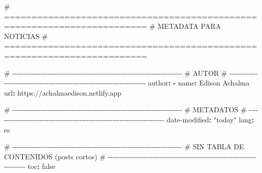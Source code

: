 \documentclass[
  doc,
  floatsintext,
  longtable,
  a4paper,
  nolmodern,
  notxfonts,
  notimes,
  12pt,
  colorlinks=true,linkcolor=blue,citecolor=blue,urlcolor=blue]{apa7}
\newenvironment{Shaded}{\begin{snugshade}}{\end{snugshade}}
\newcommand{\AttributeTok}[1]{\textcolor[rgb]{0.40,0.45,0.13}{#1}}
\newcommand{\CharTok}[1]{\textcolor[rgb]{0.13,0.47,0.30}{#1}}
\newcommand{\CommentTok}[1]{\textcolor[rgb]{0.37,0.37,0.37}{#1}}
\newcommand{\FunctionTok}[1]{\textcolor[rgb]{0.28,0.35,0.67}{#1}}
\newcommand{\KeywordTok}[1]{\textcolor[rgb]{0.00,0.23,0.31}{\textbf{#1}}}
\newcommand{\StringTok}[1]{\textcolor[rgb]{0.13,0.47,0.30}{#1}}
\begin{document}
\begin{Shaded}
\begin{Highlighting}[]
\CommentTok{\# ========================================================================}
\CommentTok{\# METADATA PARA NOTICIAS}
\CommentTok{\# ========================================================================}

\CommentTok{\# {-}{-}{-}{-}{-}{-}{-}{-}{-}{-}{-}{-}{-}{-}{-}{-}{-}{-}{-}{-}{-}{-}{-}{-}{-}{-}{-}{-}{-}{-}{-}{-}{-}{-}{-}{-}{-}{-}{-}{-}{-}{-}{-}{-}{-}{-}{-}{-}{-}{-}{-}{-}{-}{-}{-}{-}{-}{-}{-}{-}{-}{-}{-}{-}{-}{-}{-}{-}{-}{-}{-}{-}}
\CommentTok{\# AUTOR}
\CommentTok{\# {-}{-}{-}{-}{-}{-}{-}{-}{-}{-}{-}{-}{-}{-}{-}{-}{-}{-}{-}{-}{-}{-}{-}{-}{-}{-}{-}{-}{-}{-}{-}{-}{-}{-}{-}{-}{-}{-}{-}{-}{-}{-}{-}{-}{-}{-}{-}{-}{-}{-}{-}{-}{-}{-}{-}{-}{-}{-}{-}{-}{-}{-}{-}{-}{-}{-}{-}{-}{-}{-}{-}{-}}
\FunctionTok{author}\KeywordTok{:}
\AttributeTok{  }\KeywordTok{{-}}\AttributeTok{ }\FunctionTok{name}\KeywordTok{:}\AttributeTok{ Edison Achalma}
\AttributeTok{    }\FunctionTok{url}\KeywordTok{:}\AttributeTok{ https://achalmaedison.netlify.app}

\CommentTok{\# {-}{-}{-}{-}{-}{-}{-}{-}{-}{-}{-}{-}{-}{-}{-}{-}{-}{-}{-}{-}{-}{-}{-}{-}{-}{-}{-}{-}{-}{-}{-}{-}{-}{-}{-}{-}{-}{-}{-}{-}{-}{-}{-}{-}{-}{-}{-}{-}{-}{-}{-}{-}{-}{-}{-}{-}{-}{-}{-}{-}{-}{-}{-}{-}{-}{-}{-}{-}{-}{-}{-}{-}}
\CommentTok{\# METADATOS}
\CommentTok{\# {-}{-}{-}{-}{-}{-}{-}{-}{-}{-}{-}{-}{-}{-}{-}{-}{-}{-}{-}{-}{-}{-}{-}{-}{-}{-}{-}{-}{-}{-}{-}{-}{-}{-}{-}{-}{-}{-}{-}{-}{-}{-}{-}{-}{-}{-}{-}{-}{-}{-}{-}{-}{-}{-}{-}{-}{-}{-}{-}{-}{-}{-}{-}{-}{-}{-}{-}{-}{-}{-}{-}{-}}
\FunctionTok{date{-}modified}\KeywordTok{:}\AttributeTok{ }\StringTok{"today"}
\FunctionTok{lang}\KeywordTok{:}\AttributeTok{ es}

\CommentTok{\# {-}{-}{-}{-}{-}{-}{-}{-}{-}{-}{-}{-}{-}{-}{-}{-}{-}{-}{-}{-}{-}{-}{-}{-}{-}{-}{-}{-}{-}{-}{-}{-}{-}{-}{-}{-}{-}{-}{-}{-}{-}{-}{-}{-}{-}{-}{-}{-}{-}{-}{-}{-}{-}{-}{-}{-}{-}{-}{-}{-}{-}{-}{-}{-}{-}{-}{-}{-}{-}{-}{-}{-}}
\CommentTok{\# SIN TABLA DE CONTENIDOS (posts cortos)}
\CommentTok{\# {-}{-}{-}{-}{-}{-}{-}{-}{-}{-}{-}{-}{-}{-}{-}{-}{-}{-}{-}{-}{-}{-}{-}{-}{-}{-}{-}{-}{-}{-}{-}{-}{-}{-}{-}{-}{-}{-}{-}{-}{-}{-}{-}{-}{-}{-}{-}{-}{-}{-}{-}{-}{-}{-}{-}{-}{-}{-}{-}{-}{-}{-}{-}{-}{-}{-}{-}{-}{-}{-}{-}{-}}
\FunctionTok{toc}\KeywordTok{:}\AttributeTok{ }\CharTok{false}


\end{Highlighting}
\end{Shaded}
\end{document}
